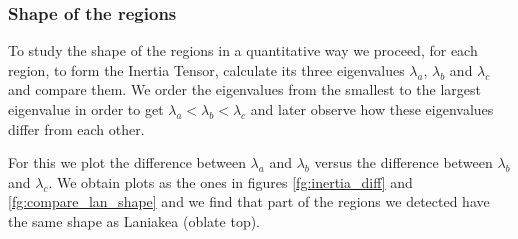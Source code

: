 \documentclass[12pt]{article}
\begin{document}
\subsubsection{Shape of the regions}

\begin{par}
To study the shape of the regions in a quantitative way we
 proceed, for each region, to form the Inertia Tensor,
  calculate its three eigenvalues $\lambda_a$, $\lambda_b$
   and $\lambda_c$ and compare them. We order the eigenvalues
    from the smallest to the
    largest eigenvalue in order to get $\lambda_a < \lambda_b
     < \lambda_c$ and later observe how these eigenvalues
   differ from each other. \\
\end{par}

\begin{par}
For this we plot the difference between $\lambda_a$ and 
 $\lambda_b$ versus the difference between $\lambda_b$ and 
  $\lambda_c$. We obtain plots as the ones in figures
   \ref{fg:inertia_diff} and \ref{fg:compare_lan_shape} and
    we find that part of the regions we detected have the
     same shape as Laniakea (oblate top).
\end{par}
\end{document}

